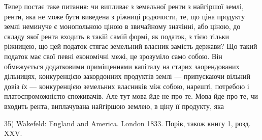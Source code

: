 Тепер постає таке питання: чи випливає з земельної ренти з найгіршої
землі, ренти, яка не може бути виведена з ріжниці родючости, те, що ціна
продукту землі неминуче є монопольною ціною в звичайному значінні, або
ціною, до складу якої рента входить в такій самій формі, як податок, з тією
тільки ріжницею, що цей податок стягає земельний власник замість держави?
Що такий податок має свої певні економічні межі, це зрозуміло само собою.
Він обмежується додатковими приміщеннями капіталу на старих заорендованих
дільницях, конкуренцією закордонних продуктів землі — припускаючи вільний
довіз їх — конкуренцією земельних власників між собою, нарешті, потребою
і платоспроможністю споживачів. Але тут мова йде не про те. Мова йде про
те, чи входить рента, виплачувана найгіршою землею, в ціну її продукту, яка

35) Wakefeld: England and America. London 1833. Порів, також книгу 1, розд. XXV.
